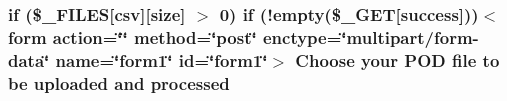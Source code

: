 \subsubsection[{\texorpdfstring{processed}{processed}}]{\setlength{\rightskip}{0pt plus 5cm}if (\$\+\_\+\+F\+I\+L\+ES\mbox{[}csv\mbox{]}\mbox{[}size\mbox{]} $>$ 0) if (!empty(\$\+\_\+\+G\+ET\mbox{[}success\mbox{]}))$<$form action=\char`\"{}\char`\"{} method=\char`\"{}post\char`\"{} enctype=\char`\"{}multipart/form-\/data\char`\"{} name=\char`\"{}form1\char`\"{} id=\char`\"{}form1\char`\"{}$>$ Choose your P\+OD file to be uploaded and processed}\hypertarget{data_services_8php_a933f9857f8ebf67bd680066a512f38ba}{}\label{data_services_8php_a933f9857f8ebf67bd680066a512f38ba}
